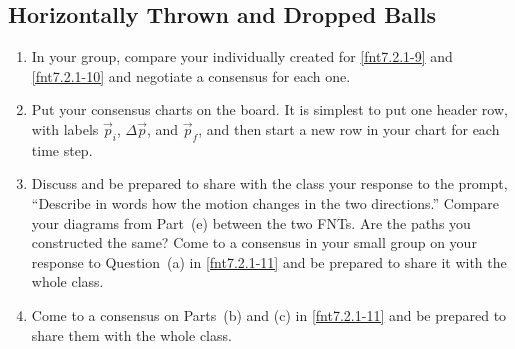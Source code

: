 \WCD

\subsection{Horizontally Thrown and Dropped Balls}

\begin{fnt}
	
\end{fnt}

\begin{fnt}
	
\end{fnt}

\begin{fnt}
	
\end{fnt}

\begin{enumerate}
	\item In your group, compare your individually created \pcharts{} for \ref{fnt7.2.1-9} and \ref{fnt7.2.1-10} and negotiate a consensus for each one.
	
	\item Put your consensus charts on the board. It is simplest to put one header row, with labels $\vec{p}_i$, $\Delta \vec{p}$, and $\vec{p}_f$, and then start a new row in your chart for each time step.
	
	\item Discuss and be prepared to share with the class your response to the prompt, ``Describe in words how the motion changes in the two directions.'' Compare your diagrams from Part~(e) between the two FNTs. Are the paths you constructed the same? Come to a consensus in your small group on your response to Question~(a) in \ref{fnt7.2.1-11} and be prepared to share it with the whole class.
	
	\item Come to a consensus on Parts~(b) and (c)  in  \ref{fnt7.2.1-11} and be prepared to share them with the whole class.
\end{enumerate}

\WCD